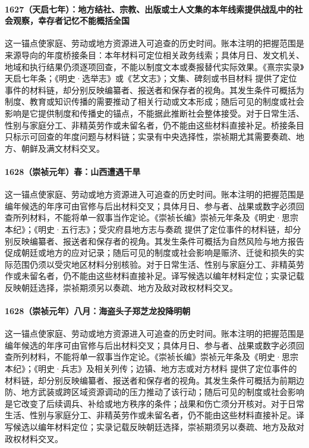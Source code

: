 \paragraph{1627（天启七年）：地方结社、宗教、出版或士人文集的本年线索提供战乱中的社会观察，幸存者记忆不能概括全国} 这一锚点使家庭、劳动或地方资源进入可追查的历史时间。账本注明的把握范围是来源导向的年度桥接条目：本年材料可定位相关政务线索；具体月日、发文机关、地域和执行结果仍须逐项回查，不能以制度文本或奏报替代实际效果。《熹宗实录》天启七年条；《明史·选举志》或《艺文志》；文集、碑刻或书目材料 提供了定位事件的材料链，却分别反映编纂者、报送者和保存者的视角。其发生条件可概括为制度、教育或知识传播的需要推动了相关行动或文本形成；随后可见的制度或社会影响是它提供制度和传播史的锚点，不能据此推断社会整体接受。对于日常生活、性别与家庭分工、非精英劳作或未留名者，仍不能由这些材料直接补足。桥接条目只标示可回查的年度问题与材料链；实录有中央选择性，崇祯期尤其需要奏疏、地方、朝鲜及满文材料交叉。

\paragraph{1628（崇祯元年）春：山西遭遇干旱} 这一锚点使家庭、劳动或地方资源进入可追查的历史时间。账本注明的把握范围是编年候选的年序可由官修与后出材料交叉；具体月日、参与者、战果或数字必须回查所列材料，不能将单一叙事当作定论。《崇祯长编》崇祯元年条及《明史·思宗本纪》；《明史·五行志》；受灾府县地方志与奏疏 提供了定位事件的材料链，却分别反映编纂者、报送者和保存者的视角。其发生条件可概括为自然风险与地方报告促成朝廷或地方的应对记录；随后可见的制度或社会影响是赈济、迁徙和损失的实际范围仍须以受灾地区材料分别核验。对于日常生活、性别与家庭分工、非精英劳作或未留名者，仍不能由这些材料直接补足。译写候选以编年材料定位；实录记载反映朝廷选择，崇祯期须另以奏疏、地方及敌对政权材料交叉。

\paragraph{1628（崇祯元年）八月：海盗头子郑芝龙投降明朝} 这一锚点使家庭、劳动或地方资源进入可追查的历史时间。账本注明的把握范围是编年候选的年序可由官修与后出材料交叉；具体月日、参与者、战果或数字必须回查所列材料，不能将单一叙事当作定论。《崇祯长编》崇祯元年条及《明史·思宗本纪》；《明史·兵志》及相关列传；边镇、地方志或对方材料 提供了定位事件的材料链，却分别反映编纂者、报送者和保存者的视角。其发生条件可概括为前期边防、地方武装或跨区域资源调动的压力推动了该行动；随后可见的制度或社会影响是它改变了后续调兵、补给或地方秩序的条件；战果和伤亡须分开核对。对于日常生活、性别与家庭分工、非精英劳作或未留名者，仍不能由这些材料直接补足。译写候选以编年材料定位；实录记载反映朝廷选择，崇祯期须另以奏疏、地方及敌对政权材料交叉。

